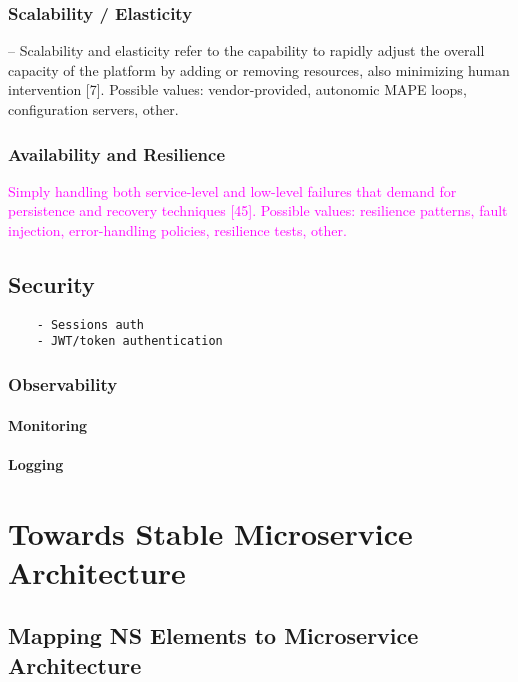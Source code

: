 \documentclass[thesis=M,english,hidelinks]{FITthesis}[2012/10/20]
\begin{document}
\subsection{Scalability / Elasticity}
– Scalability and elasticity refer to the capability to rapidly adjust the overall capacity of the platform by adding or removing resources, also minimizing human intervention [7]. Possible values: vendor-provided, autonomic MAPE loops, configuration servers, other.
\subsection{Availability and Resilience}
\textcolor{magenta}{Simply handling both service-level and low-level failures that demand for persistence and recovery techniques [45]. Possible values: resilience patterns, fault injection, error-handling policies, resilience tests, other.}

\section{Security}
\begin{verbatim}
    - Sessions auth
    - JWT/token authentication
\end{verbatim}


\subsection{Observability}
\subsubsection{Monitoring}
\subsubsection{Logging}


% 
% 

\chapter{Towards Stable Microservice Architecture}
\label{sec:msa_compliance}
\section{Mapping NS Elements to Microservice Architecture}
\end{document}
